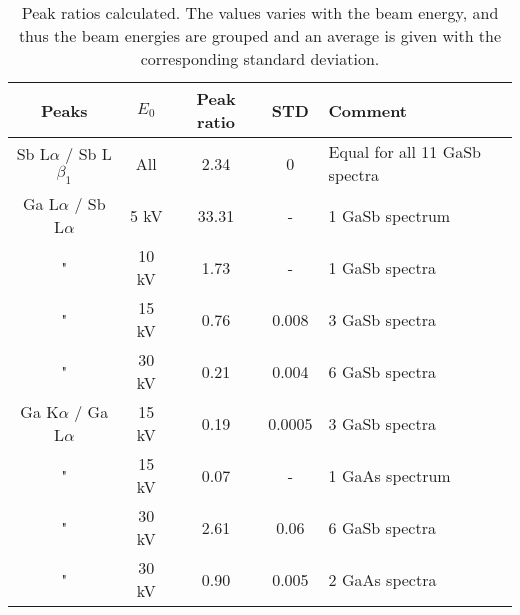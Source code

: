 \begin{table}[phtb]
    \begin{center}
        \caption{
            Peak ratios calculated.
            The values varies with the beam energy, and thus the beam energies are grouped and an average is given with the corresponding standard deviation.
        }
        \renewcommand*{\arraystretch}{1.4}
        \label{tab:results:peak_ratios}
        \begin{tabular}{ccccl}
            \hline
            \textbf{Peaks}               & \textbf{$E_0$} & \textbf{Peak ratio} & \textbf{STD} & \textbf{Comment}              \\
            \hline
            Sb L$\alpha$ / Sb L$\beta_1$ & All            & 2.34                & 0            & Equal for all 11 GaSb spectra \\
            Ga L$\alpha$ / Sb L$\alpha$  & 5 kV           & 33.31               & -            & 1 GaSb spectrum               \\
            "                            & 10 kV          & 1.73                & -            & 1 GaSb spectra                \\
            "                            & 15 kV          & 0.76                & 0.008        & 3 GaSb spectra                \\
            "                            & 30 kV          & 0.21                & 0.004        & 6 GaSb spectra                \\
            Ga K$\alpha$ / Ga L$\alpha$  & 15 kV          & 0.19                & 0.0005       & 3 GaSb spectra                \\
            "                            & 15 kV          & 0.07                & -            & 1 GaAs spectrum               \\
            "                            & 30 kV          & 2.61                & 0.06         & 6 GaSb spectra                \\
            "                            & 30 kV          & 0.90                & 0.005        & 2 GaAs spectra                \\
            \hline
        \end{tabular}
    \end{center}
\end{table}
